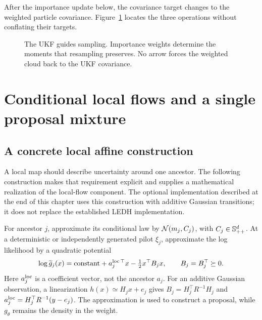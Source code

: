 After the importance update below, the covariance target changes to the
weighted particle covariance. Figure~\ref{fig:bf-covariance-proposal-covariance-roles} locates
the three operations without conflating their targets.
\begin{figure}[htbp]
\centering
{}
\caption{The UKF guides sampling. Importance weights determine the moments
that resampling preserves. No arrow forces the weighted cloud back to
the UKF covariance.}
\label{fig:bf-covariance-proposal-covariance-roles}
\end{figure}

\section{Conditional local flows and a single proposal mixture}

\subsection{A concrete local affine construction}

A local map should describe uncertainty around one ancestor. The following
construction makes that requirement explicit and supplies a mathematical
realization of the local-flow component. The optional implementation described
at the end of this chapter uses this construction with additive Gaussian
transitions; it does not replace the established LEDH implementation.

For ancestor \(j\), approximate its conditional law by
\(\mathcal N(m_j,C_j)\), with \(C_j\in\mathbb S_{++}^d\).
At a deterministic or independently generated pilot \(\xi_j\), approximate
the log likelihood by a quadratic potential
\begin{equation}
\label{eq:bf-covariance-proposal-quadratic-guide}
 \log \widetilde g_j(x)
 =\mathrm{constant}+a_j^{\rm loc\,\top}x-\tfrac12x^\top B_jx,
 \qquad B_j=B_j^\top\succeq0 .
\end{equation}
Here \(a_j^{\rm loc}\) is a coefficient vector, not the ancestor \(a_j\).
For an additive Gaussian observation, a linearization
\(h(x)\simeq H_jx+e_j\) gives
\(B_j=H_j^\top R^{-1}H_j\) and
\(a_j^{\rm loc}=H_j^\top R^{-1}(y-e_j)\).
The approximation is used to construct a proposal, while \(g_\theta\)
remains the density in the weight.


